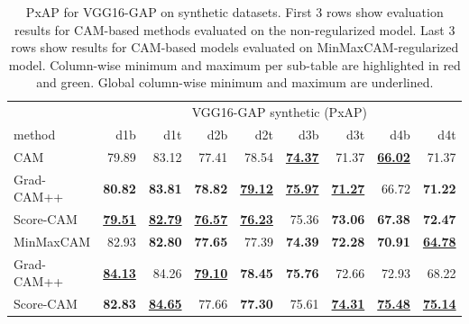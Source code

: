 \begin{table}[H]
\centering
\begin{tabular}{lrrrrrrrr}
\toprule
 & \multicolumn{8}{c}{VGG16-GAP synthetic (PxAP)} \\
method & d1b & d1t & d2b & d2t & d3b & d3t & d4b & d4t \\
\cmidrule(lr){1-1} \cmidrule(lr){2-9} 
CAM & 79.89 & 83.12 & 77.41 & 78.54 & \color{purple} \bfseries \underline{74.37} & 71.37 & \color{purple} \bfseries \underline{66.02} & 71.37 \\
Grad-CAM++ & \color{teal} \bfseries 80.82 & \color{teal} \bfseries 83.81 & \color{teal} \bfseries 78.82 & \color{teal} \bfseries \underline{79.12} & \color{teal} \bfseries \underline{75.97} & \color{purple} \bfseries \underline{71.27} & 66.72 & \color{purple} \bfseries 71.22 \\
Score-CAM & \color{purple} \bfseries \underline{79.51} & \color{purple} \bfseries \underline{82.79} & \color{purple} \bfseries \underline{76.57} & \color{purple} \bfseries \underline{76.23} & 75.36 & \color{teal} \bfseries 73.06 & \color{teal} \bfseries 67.38 & \color{teal} \bfseries 72.47 \\
\cmidrule(lr){1-1} \cmidrule(lr){2-9} 
MinMaxCAM & 82.93 & \color{purple} \bfseries 82.80 & \color{purple} \bfseries 77.65 & 77.39 & \color{purple} \bfseries 74.39 & \color{purple} \bfseries 72.28 & \color{purple} \bfseries 70.91 & \color{purple} \bfseries \underline{64.78} \\
Grad-CAM++ & \color{teal} \bfseries \underline{84.13} & 84.26 & \color{teal} \bfseries \underline{79.10} & \color{teal} \bfseries 78.45 & \color{teal} \bfseries 75.76 & 72.66 & 72.93 & 68.22 \\
Score-CAM & \color{purple} \bfseries 82.83 & \color{teal} \bfseries \underline{84.65} & 77.66 & \color{purple} \bfseries 77.30 & 75.61 & \color{teal} \bfseries \underline{74.31} & \color{teal} \bfseries \underline{75.48} & \color{teal} \bfseries \underline{75.14} \\
\bottomrule
\end{tabular}
\caption[PxAP for VGG16-GAP on synthetic datasets]{PxAP for VGG16-GAP on synthetic datasets. First 3 rows show evaluation results for CAM-based methods evaluated on the non-regularized model. Last 3 rows show results for CAM-based models evaluated on MinMaxCAM-regularized model. Column-wise minimum and maximum per sub-table are highlighted in red and green. Global column-wise minimum and maximum are underlined.}
\label{tab:pxap_vgg16_gap_synthetic}
\end{table}

